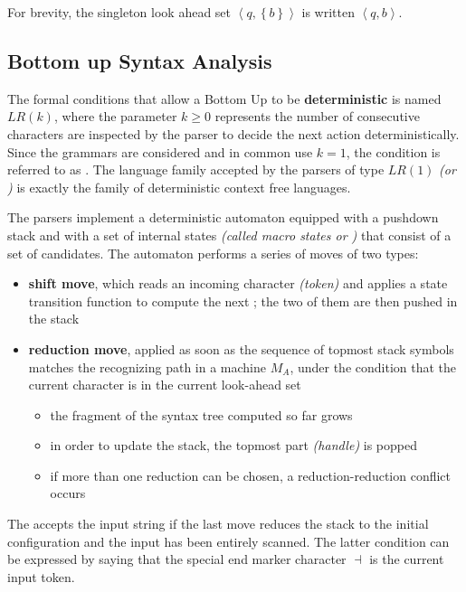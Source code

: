 \documentclass[english]{article}
\begin{document}
For brevity, the singleton look ahead set \(\left\langle q, \left\{ b \right\} \right\rangle\) is written \(\left\langle q, b \right\rangle\).

\subsection{Bottom up Syntax Analysis}

The formal conditions that allow a Bottom Up to be \textbf{deterministic} is named \(\textit{LR}(k)\), where the parameter \(k \geq 0\) represents the number of consecutive characters are inspected by the parser to decide the next action deterministically.
Since the \EBNF grammars are considered and in common use \(k=1\), the condition is referred to as \ELRo.
The language family accepted by the parsers of type \(\textit{LR}(1)\) \textit{(or \ELRo)} is exactly the family \DET of deterministic context free languages.

The \ELRo parsers implement a deterministic automaton equipped with a pushdown stack and with a set of internal states \textit{(called macro states or \mstates)} that consist of a set of candidates.
The automaton performs a series of moves of two types:

\begin{itemize}
  \item \textbf{shift move}, which reads an incoming character \textit{(token)} and applies a state transition function to compute the next \mstate; the two of them are then pushed in the stack
  \item \textbf{reduction move}, applied as soon as the sequence of topmost stack symbols matches the recognizing path in a machine \(M_A\), under the condition that the current character is in the current look-ahead set
        \begin{itemize}[label=\(\rightarrow\)]
          \item the fragment of the syntax tree computed so far grows
          \item in order to update the stack, the topmost part \textit{(handle)} is popped
          \item if more than one reduction can be chosen, a reduction-reduction conflict occurs
        \end{itemize}
\end{itemize}

The \PDA accepts the input string if the last move reduces the stack to the initial configuration and the input has been entirely scanned.
The latter condition can be expressed by saying that the special end marker character \(\dashv\) is the current input token.
\end{document}
